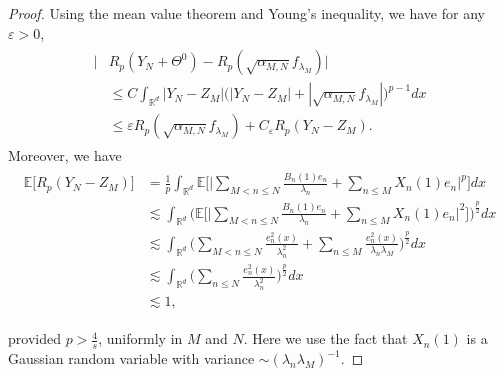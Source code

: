\documentclass[%
11pt,  reqno]{amsart}
\theoremstyle{remarkstyle}
\newcommand{\1}{\hspace{0.2mm}\text{I}\hspace{0.2mm}}
\newcommand{\noi}{\noindent}
\newcommand{\R}{\mathbb{R}}
\newcommand{\E}{\mathbb{E}}
\newcommand{\eps}{\varepsilon}
\newcommand{\ld}{\lambda}
\newcommand{\les}{\lesssim}
\numberwithin{equation}{section}
\numberwithin{theorem}{section}
\newcommand{\Dr}{\Theta}
\begin{document}
	
	\begin{proof} Using the mean value theorem and Young's inequality, we have for any $\eps > 0$,
		\begin{align}
			\begin{split} 
				\big| & R_p(Y_N + \Dr^0) - R_p( \sqrt{\alpha_{M,N}} f_{\ld_M})\big|\\
				&\le C \int_{\R^d} |Y_N - Z_M| \big(|Y_N-Z_M| + | \sqrt{\alpha_{M,N}} f_{\ld_M}|\big)^{p-1}dx\\
				& \le \eps R_p( \sqrt{\alpha_{M,N}} f_{\ld_M}) +C_\eps R_p(Y_N-Z_M).
			\end{split}
			\label{paa}
		\end{align}
		Moreover, 
		we have
		\begin{align}
			\begin{split}
				\E\big[R_p(Y_N -Z_M) \big] & = \frac 1p \int_{\R^d} \E \bigg[ \Big|\sum_{M < n\le N}\frac{B_n(1) e_n}{\lambda_n}+\sum_{n\le M}X_n(1)e_n\Big|^p \bigg] dx\\
				&\les  \int_{\R^d} \bigg( \E \bigg[ \Big|\sum_{M < n\le N}\frac{B_n(1) e_n}{\lambda_n}+\sum_{n\le M}X_n(1)e_n\Big|^2 \bigg]\bigg)^{\frac{p}{2}}dx\\
				&\les  \int_{\R^d}\Big(\sum_{M < n\le N}\frac{e_n^2 (x)}{\lambda_n^2}+\sum_{n\le M}\frac{e_n^2 (x)}{\lambda_n \ld_M } \Big)^{\frac{p}{2}}dx\\ 
				&\les  \int_{\R^d}\Big(\sum_{ n\le N}\frac{e_n^2 (x)}{\lambda_n^2 } \Big)^{\frac{p}{2}}dx \\ 
				&\les  1,
			\end{split}
			\label{paa2}
		\end{align}
		
		\noi 
		provided $p > \frac4s$, uniformly in $M$ and $N$.
		Here we use the fact that $X_n (1)$ is a Gaussian random variable with variance
		$\sim (\ld_n \ld_M )^{-1}$.
		

\end{proof}
\end{document}
